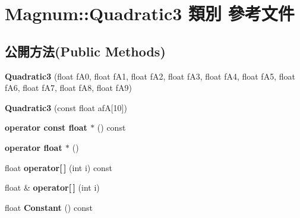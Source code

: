 \hypertarget{class_magnum_1_1_quadratic3}{}\section{Magnum\+:\+:Quadratic3 類別 參考文件}
\label{class_magnum_1_1_quadratic3}
\subsection*{公開方法(Public Methods)}
\begin{DoxyCompactItemize}
\item 
{\bfseries Quadratic3} (float f\+A0, float f\+A1, float f\+A2, float f\+A3, float f\+A4, float f\+A5, float f\+A6, float f\+A7, float f\+A8, float f\+A9)\hypertarget{class_magnum_1_1_quadratic3_aec085c92fc3011c6ce12600222d350b8}{}\label{class_magnum_1_1_quadratic3_aec085c92fc3011c6ce12600222d350b8}

\item 
{\bfseries Quadratic3} (const float afA\mbox{[}10\mbox{]})\hypertarget{class_magnum_1_1_quadratic3_a5bb1acb6adfeca333a8d7a55afc8d14e}{}\label{class_magnum_1_1_quadratic3_a5bb1acb6adfeca333a8d7a55afc8d14e}

\item 
{\bfseries operator const float $\ast$} () const \hypertarget{class_magnum_1_1_quadratic3_ad95b8c320cecbf53b23fefa66a39e6c0}{}\label{class_magnum_1_1_quadratic3_ad95b8c320cecbf53b23fefa66a39e6c0}

\item 
{\bfseries operator float $\ast$} ()\hypertarget{class_magnum_1_1_quadratic3_a20dc0e82e044e53856982c151c9205ca}{}\label{class_magnum_1_1_quadratic3_a20dc0e82e044e53856982c151c9205ca}

\item 
float {\bfseries operator\mbox{[}$\,$\mbox{]}} (int i) const \hypertarget{class_magnum_1_1_quadratic3_a0eff09ccba459814d2ccb0aaccd54bef}{}\label{class_magnum_1_1_quadratic3_a0eff09ccba459814d2ccb0aaccd54bef}

\item 
float \& {\bfseries operator\mbox{[}$\,$\mbox{]}} (int i)\hypertarget{class_magnum_1_1_quadratic3_a2c6b80a1654005c2348f5c9cf6040841}{}\label{class_magnum_1_1_quadratic3_a2c6b80a1654005c2348f5c9cf6040841}

\item 
float {\bfseries Constant} () const \hypertarget{class_magnum_1_1_quadratic3_a4ad701f75049070b2de4d2a76a9e60b4}{}\label{class_magnum_1_1_quadratic3_a4ad701f75049070b2de4d2a76a9e60b4}


\end{DoxyCompactItemize}
